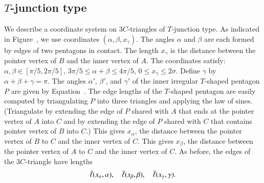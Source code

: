 

\subsection{$T$-junction type}

We describe a coordinate system on $3C$-triangles of $T$-junction
type.  As indicated in Figure~, we use coordinates
$(\alpha,\beta,x_\gamma)$.  The angles $\alpha$ and $\beta$ are each
formed by edges of two pentagons in contact.  The length $x_\gamma$ is
the distance between the pointer vertex of $B$ and the inner vertex of
$A$.  The coordinates satisfy: $\alpha,\beta\in[\pi/5,2\pi/5]$,
$3\pi/5\le \alpha+\beta\le 4\pi/5$, $0\le x_\gamma\le 2\sigma$.
Define $\gamma$ by $\alpha+\beta+\gamma=\pi$.  The angles $\alpha'$,
$\beta'$, and $\gamma'$ of the inner irregular $T$-shaped pentagon $P$
are given by Equation~.  The edge lengths of the
$T$-shaped pentagon are easily computed by triangulating $P$ into
three triangles and applying the law of sines.  (Triangulate by
extending the edge of $P$ shared with $A$ that ends at the pointer
vertex of $A$ into $C$ and by extending the edge of $P$ shared with
$C$ that contains pointer vertex of $B$ into $C$.)  This gives
$x_\alpha$, the distance between the pointer vertex of $B$ to $C$ and
the inner vertex of $C$.  This gives $x_\beta$, the distance between
the pointer vertex of $A$ to $C$ and the inner vertex of $C$.  As
before, the edges of the $3C$-triangle have lengths
\[
\bar\ell(x_\alpha,\alpha),\quad \bar\ell(x_\beta,\beta),\quad \bar\ell(x_\gamma,\gamma).
\]




